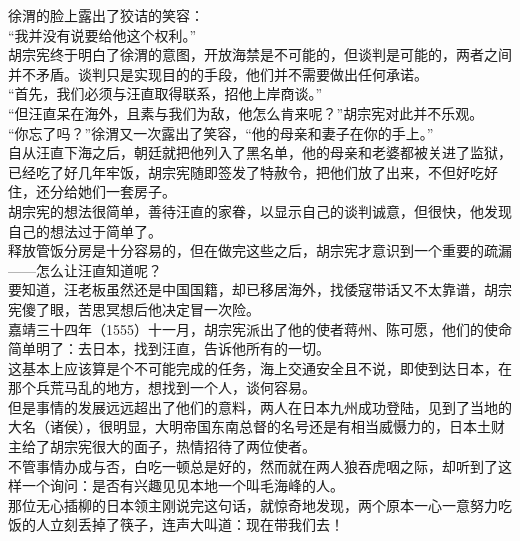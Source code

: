 \begin{multicols}{\theparacolNo}
徐渭的脸上露出了狡诘的笑容：\\

“我并没有说要给他这个权利。”\\

胡宗宪终于明白了徐渭的意图，开放海禁是不可能的，但谈判是可能的，两者之间并不矛盾。谈判只是实现目的的手段，他们并不需要做出任何承诺。\\

“首先，我们必须与汪直取得联系，招他上岸商谈。”\\

“但汪直呆在海外，且素与我们为敌，他怎么肯来呢？”胡宗宪对此并不乐观。\\

“你忘了吗？”徐渭又一次露出了笑容，“他的母亲和妻子在你的手上。”\\

自从汪直下海之后，朝廷就把他列入了黑名单，他的母亲和老婆都被关进了监狱，已经吃了好几年牢饭，胡宗宪随即签发了特赦令，把他们放了出来，不但好吃好住，还分给她们一套房子。\\

胡宗宪的想法很简单，善待汪直的家眷，以显示自己的谈判诚意，但很快，他发现自己的想法过于简单了。\\

释放管饭分房是十分容易的，但在做完这些之后，胡宗宪才意识到一个重要的疏漏——怎么让汪直知道呢？\\

要知道，汪老板虽然还是中国国籍，却已移居海外，找倭寇带话又不太靠谱，胡宗宪傻了眼，苦思冥想后他决定冒一次险。\\

嘉靖三十四年（1555）十一月，胡宗宪派出了他的使者蒋州、陈可愿，他们的使命简单明了：去日本，找到汪直，告诉他所有的一切。\\

这基本上应该算是个不可能完成的任务，海上交通安全且不说，即使到达日本，在那个兵荒马乱的地方，想找到一个人，谈何容易。\\

但是事情的发展远远超出了他们的意料，两人在日本九州成功登陆，见到了当地的大名（诸侯），很明显，大明帝国东南总督的名号还是有相当威慑力的，日本土财主给了胡宗宪很大的面子，热情招待了两位使者。\\

不管事情办成与否，白吃一顿总是好的，然而就在两人狼吞虎咽之际，却听到了这样一个询问：是否有兴趣见见本地一个叫毛海峰的人。\\

那位无心插柳的日本领主刚说完这句话，就惊奇地发现，两个原本一心一意努力吃饭的人立刻丢掉了筷子，连声大叫道：现在带我们去！\\


\end{multicols}
